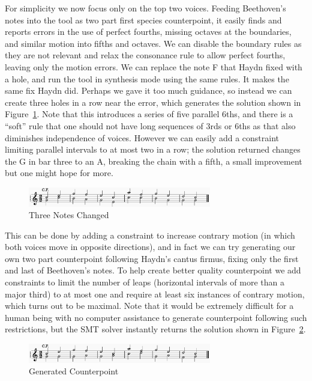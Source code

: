 \documentclass[sigplan,screen]{acmart}
\begin{document}
For simplicity we now focus only on the top two voices. Feeding
Beethoven's notes into the tool as two part first species
counterpoint, it easily finds and reports errors in the use of perfect
fourths, missing octaves at the boundaries, and similar motion into
fifths and octaves. We can disable the boundary rules as they are not
relevant and relax the consonance rule to allow perfect fourths, leaving
only the motion errors. We can replace the note F that Haydn fixed
with a hole, and run the tool in synthesis mode using the same
rules. It makes the same fix Haydn did. Perhaps we gave it too much
guidance, so instead we can create three holes in a row near the
error, which generates the solution shown in
Figure~\ref{fig:b146fix3}. Note that this introduces a series of five
parallel 6ths, and there is a ``soft'' rule that one should not have
long sequences of 3rds or 6ths as that also diminishes independence
of voices. However we can easily add a constraint limiting parallel
intervals to at most two in a row; the solution returned changes the G
in bar three to an A, breaking the chain with a fifth, a small
improvement but one might hope for more.

\begin{figure}
  \includegraphics[width=8cm]{figures/b146fix3.png}
  \caption{Three Notes Changed}
  \label{fig:b146fix3}
\end{figure}

This can be done by adding a constraint to increase contrary motion
(in which both voices move in opposite directions), and in fact we can
try generating our own two part counterpoint following Haydn's cantus
firmus, fixing only the first and last of Beethoven's notes. To help
create better quality counterpoint we add constraints to limit the
number of leaps (horizontal intervals of more than a major third) to
at most one and require at least six instances of contrary motion,
which turns out to be maximal. Note that it would be extremely
difficult for a human being with no computer assistance to generate
counterpoint following such restrictions, but the SMT solver instantly
returns the solution shown in Figure~\ref{fig:b146gen3}.

\begin{figure}
  \includegraphics[width=8cm]{figures/b146gen3.png}
  \caption{Generated Counterpoint}
  \label{fig:b146gen3}
\end{figure}
\end{document}
